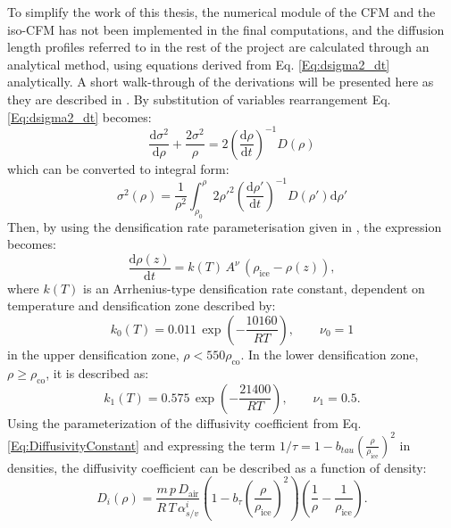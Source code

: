 \documentclass[../../CompleteThesis/Complete_1stDraft.tex]{subfiles}
\begin{document}
To simplify the work of this thesis, the numerical module of the CFM and the iso-CFM has not been implemented in the final computations, and the diffusion length profiles referred to in the rest of the project are calculated through an analytical method, using equations derived from Eq. \ref{Eq:dsigma2_dt} analytically. A short walk-through of the derivations will be presented here as they are described in \cite[Gkinis et al., 2021]{Gkinis2021}.
By substitution of variables rearrangement Eq. \ref{Eq:dsigma2_dt} becomes:
\begin{equation}
	\frac{\text{d}\sigma^2}{\text{d}\rho} + \frac{2\sigma^2}{\rho} = 2\left(\frac{\text{d}\rho}{\text{d}t}\right)^{-1}D(\rho)
	\label{Eq:dsigma_dt_rearrange}
\end{equation}
which can be converted to integral form:
\begin{equation}
	\sigma^2(\rho) = \frac{1}{\rho^2}\int_{\rho_0}^{\rho}2\rho'^2\left(\frac{\text{d}\rho'}{\text{d}t}\right)^{-1}D(\rho')\text{d}\rho'
	\label{Eq:sigma2_rho_integral}
\end{equation}
Then, by using the densification rate parameterisation given in \cite[Herron and Langway, 1980]{HerronLangway1980}, the expression becomes:
\begin{equation}
	\frac{\text{d}\rho(z)}{\text{d}t} = k(T)\, A^{\nu}\, (\rho_{\text{ice}} - \rho(z)),
	\label{Eq:drho_dt}
\end{equation}
where $k(T)$ is an Arrhenius-type densification rate constant, dependent on temperature and densification zone described by:
\begin{equation}
	k_0(T) = 0.011\, \exp\left(-\frac{10160}{RT}\right), \qquad \nu_0 = 1
	\label{Eq:ArrCoeff_Zone1}
\end{equation}
in the upper densification zone, $\rho < 550 \rho_{\text{co}}$. In the lower densification zone, $\rho \geq \rho_{\text{co}}$, it is described as:
\begin{equation}
	k_1(T) = 0.575\, \exp\left(-\frac{21400}{RT}\right), \qquad \nu_1 = 0.5.
	\label{Eq:ArrCoeff_Zone2}
\end{equation}
Using the parameterization of the diffusivity coefficient from Eq. \ref{Eq:DiffusivityConstant} and expressing the term $1/\tau = 1-b_{tau}\left(\frac{\rho}{\rho_{\text{ice}}}\right)^2$ in densities, the diffusivity coefficient can be described as a function of density:
\begin{equation}
	D_i(\rho) = \frac{m \, p \, D_{\text{air}}}{R \, T \, \alpha_{s/v}^i}\left(1-b_{\tau}\left(\frac{\rho}{\rho_{\text{ice}}}\right)^2\right)\left(\frac{1}{\rho} - \frac{1}{\rho_{\text{ice}}}\right).
	\label{Eq:DiffusivityConstant_2}
\end{equation}
\end{document}
